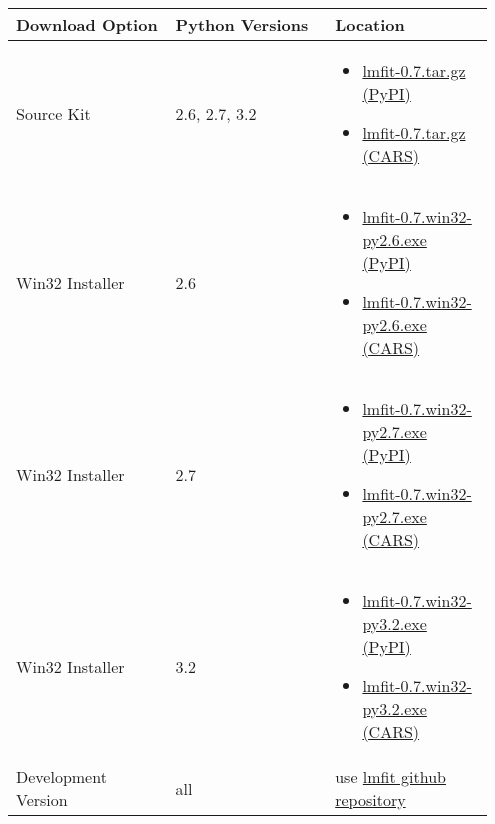 \documentclass[letterpaper,10pt,english]{sphinxmanual}
\begin{document}
\begin{tabular}{|p{0.317\linewidth}|p{0.317\linewidth}|p{0.317\linewidth}|}
\hline
\textbf{
Download Option
} & \textbf{
Python Versions
} & \textbf{
Location
}\\\hline

Source Kit
 & 
2.6, 2.7, 3.2
 & \begin{itemize}
\item {} 
\href{http://pypi.python.org/packages/source/l/lmfit/lmfit-0.7.tar.gz}{lmfit-0.7.tar.gz (PyPI)}

\item {} 
\href{http://cars9.uchicago.edu/software/python/lmfit/src/lmfit-0.7.tar.gz}{lmfit-0.7.tar.gz (CARS)}

\end{itemize}
\\\hline

Win32 Installer
 & 
2.6
 & \begin{itemize}
\item {} 
\href{http://pypi.python.org/packages/2.6/l/lmfit/lmfit-0.7.win32-py2.6.exe}{lmfit-0.7.win32-py2.6.exe (PyPI)}

\item {} 
\href{http://cars9.uchicago.edu/software/python/lmfit/src/lmfit-0.7.win32-py2.6.exe}{lmfit-0.7.win32-py2.6.exe (CARS)}

\end{itemize}
\\\hline

Win32 Installer
 & 
2.7
 & \begin{itemize}
\item {} 
\href{http://pypi.python.org/packages/2.7/l/lmfit/lmfit-0.7.win32-py2.7.exe}{lmfit-0.7.win32-py2.7.exe (PyPI)}

\item {} 
\href{http://cars9.uchicago.edu/software/python/lmfit/src/lmfit-0.7.win32-py2.7.exe}{lmfit-0.7.win32-py2.7.exe (CARS)}

\end{itemize}
\\\hline

Win32 Installer
 & 
3.2
 & \begin{itemize}
\item {} 
\href{http://pypi.python.org/packages/3.2/l/lmfit/lmfit-0.7.win32-py3.2.exe}{lmfit-0.7.win32-py3.2.exe (PyPI)}

\item {} 
\href{http://cars9.uchicago.edu/software/python/lmfit/src/lmfit-0.7.win32-py3.2.exe}{lmfit-0.7.win32-py3.2.exe (CARS)}

\end{itemize}
\\\hline

Development Version
 & 
all
 & 
use \href{http://github.com/newville/lmfit-py}{lmfit github repository}
\\\hline
\end{tabular}
\end{document}
